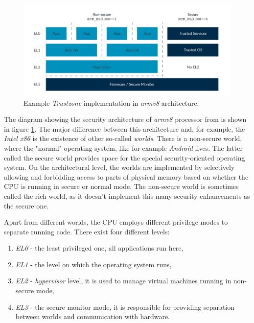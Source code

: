 \begin{figure}
    \centering
    \includegraphics[width=.9\linewidth]{tex/img/trustzone.jpg}
    \caption{Example \textit{Trustzone} implementation in \textit{armv8} architecture.}
    \label{fig:tzarmv8}
\end{figure}

The diagram showing the security architecture of \textit{armv8} processor from \cite{tzsyf} is shown in figure \ref{fig:tzarmv8}. The major difference between this architecture and, for example, the \textit{Intel x86} is the existence of other so-called \textit{worlds}. There is a non-secure world, where the "normal" operating system, like for example \textit{Android} lives. The latter called the secure world provides space for the special security-oriented operating system. On the architectural level, the worlds are implemented by selectively allowing and forbidding access to parts of physical memory based on whether the CPU is running in secure or normal mode. The non-secure world is sometimes called the rich world, as it doesn't implement this many security enhancements as the secure one.

Apart from different worlds, the CPU employs different privilege modes to separate running code. There exist four different levels:
\begin{enumerate}
    \item \textit{EL0} - the least privileged one, all applications run here,
    \item \textit{EL1} - the level on which the operating system runs,
    \item \textit{EL2} - \textit{hypervisor} level, it is used to manage virtual machines running in non-secure mode,
    \item \textit{EL3} - the secure monitor mode, it is responsible for providing separation between worlds and communication with hardware.
\end{enumerate}

